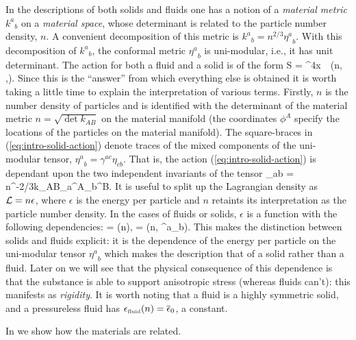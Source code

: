 In the descriptions of both solids and fluids  one has a notion of a \textit{material metric} ${k^a}_b$ on a \textit{material space}, whose determinant is related to the particle number density, $n$. A convenient decomposition of this metric is ${k^a}_b = n^{2/3}{\eta^a}_b$. With this decomposition of   ${k^a}_b$, the conformal metric ${\eta^a}_b$ is uni-modular, i.e., it has unit determinant. The action for both a fluid and a solid is of the form 
\bea
\label{eq:intro-solid-action}
S = \int \dd^4x\, \, \ld\left(n, \left[ \gbm{\eta}\right],\left[\gbm{\eta}^2\right]\right).
\eea
Since this is the ``answer'' from which everything else is obtained  it is worth taking a little time to explain the interpretation of various terms. Firstly, $n$ is the number density of particles and is identified with the determinant of the material metric $n = \sqrt{\det k_{AB}}$ on the material manifold (the coordinates $\phi^A$ specify the locations of the particles on the material manifold). The square-braces in (\ref{eq:intro-solid-action}) denote traces of the mixed components of the uni-modular tensor, ${\eta^a}_b = \gamma^{ac}\eta_{cb}$. That is, the action (\ref{eq:intro-solid-action}) is dependant upon the two independent invariants of the tensor
\bea
\eta_{ab} = n^{-2/3}k_{AB}\partial_a\phi^A\partial_b\phi^B.
\eea
It is useful to split up the Lagrangian density   as $\mathcal{L} = n \epsilon$, where $\epsilon$ is the energy per particle and $n$ retaints its interpretation as the particle number density. In the  cases of   fluids or solids, $\epsilon$ is a function with the following dependencies:
\bea
{} = (n),\qquad {} = (n, {\eta^a}_b).
\eea
This makes the distinction between solids and fluids explicit: it is the dependence of the energy per particle on the uni-modular tensor ${\eta^a}_b$ which makes the description that of a solid rather than a fluid. Later on we will see that the physical consequence of this dependence is that the substance is able to support anisotropic stress (whereas fluids can't): this manifests as \textit{rigidity}. It is worth noting that a fluid is a highly symmetric solid, and a pressureless fluid has ${\epsilon}_{\scriptscriptstyle{\textrm{fluid}}}(n) = \overline{\epsilon}_0$, a constant.

In  we show how the materials are related.



